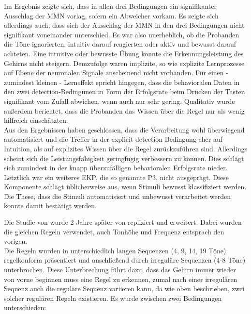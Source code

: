 \documentclass[doc,a4paper,12pt]{apa6}
\begin{document}
Im Ergebnis zeigte sich, dass in allen drei Bedingungen ein signifikanter Ausschlag der MMN vorlag, sofern ein Abweicher vorkam. Es zeigte sich allerdings auch, dass sich der Ausschlag der MMN in den drei Bedingungen nicht signifikant voneinander unterschied. Es war also unerheblich, ob die Probanden die Töne ignorierten, intuitiv darauf reagierten oder aktiv und bewusst darauf achteten. Eine intuitive oder bewusste Übung konnte die Erkennungsleistung des Gehirns nicht steigern. Demzufolge waren implizite, so wie explizite Lernprozesse auf Ebene der neuronalen Signale anscheinend nicht vorhanden. Für einen - zumindest kleinen - Lerneffekt spricht hingegen, dass die behavioralen Daten in den zwei detection-Bedingunen in Form der Erfolgsrate beim Drücken der Tasten signifikant vom Zufall abwichen, wenn auch nur sehr gering. Qualitativ wurde außerdem berichtet, dass die Probanden das Wissen über die Regel nur als wenig hilfreich einschätzten.\\
Aus den Ergebnissen haben \textcite{paavilainen2007preattentive} geschlossen, dass die Verarbeitung wohl überwiegend automatisiert und die Treffer in der explicit detection Bedingung eher auf Intuition, als auf explizites Wissen über die Regel zurückzuführen sind. Allerdings scheint sich die  Leistungsfähigkeit geringfügig verbessern zu können. Dies schlägt sich zumindest in der knapp überzufälligen behavioralen Erfolgsrate nieder. Letztlich war ein weiteres EKP, die so genannte P3, nicht ausgeprägt. Diese Komponente schlägt üblicherweise aus, wenn Stimuli bewusst klassifiziert werden. Die These, dass die Stimuli automatisiert und unbewusst verarbeitet werden konnte damit bestätigt werden.

Die Studie von \textcite{paavilainen2007preattentive} wurde 2 Jahre später von \textcite{bendixen2008rapid} repliziert und erweitert. Dabei wurden die gleichen Regeln verwendet, auch Tonhöhe und Frequenz entsprach den vorigen.\\
Die Regeln wurden in unterschiedlich langen Sequenzen (4, 9, 14, 19 Töne) regelkonform präsentiert und anschließend durch irreguläre Sequenzen (4-8 Töne) unterbrochen. Diese Unterbrechung führt dazu, dass das Gehirn immer wieder von vorne beginnen muss eine Regel zu erkennen, zumal nach einer irregulären Sequenz auch die reguläre Sequenz variieren kann, da wie oben beschrieben, zwei solcher regulären Regeln existieren. Es wurde zwischen zwei Bedingungen unterschieden:

\end{document}
